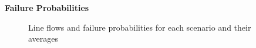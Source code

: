 \textbf{Failure Probabilities}

\begin{figure}
\centering
%

 \caption{Line flows and failure probabilities for each scenario and  their averages}
\label{fig:flows}
\end{figure}
